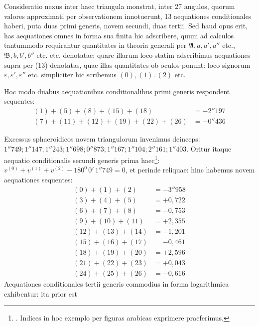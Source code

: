 Consideratio nexus inter haec triangula monstrat, inter 27 angulos, quorum valores approximati per observationem innotuerunt, 13 aequationes conditionales haberi, puta duas primi generis, novem secundi, duas tertii. Sed haud opus erit, has aequationes omnes in forma sua finita hic adscribere, quum ad calculos tantummodo requirantur quantitates in theoria generali per \(\mathfrak A,a,a',a''\) etc., \(\mathfrak B,b,b',b''\) etc. etc. denotatae: quare illarum loco statim adscribimus aequationes supra per (13) denotatas, quae illas quantitates ob oculos ponunt: loco signorum \(\varepsilon,\varepsilon',\varepsilon''\) etc. simpliciter hic scribemus \((0),(1).\ (2)\) etc.

Hoc modo duabus aequationibus conditionalibus primi generis respondent sequentes:
\[
\begin{aligned}
(1)+(5)+(8)+(15)+(18)&=-2''197\\
(7)+(11)+(12)+(19)+(22)+(26)&=-0''436
\end{aligned}
\]

Excessus sphaeroidicos novem triangulorum invenimus deinceps: \(1''749;\allowbreak1''147;\allowbreak1''243;\allowbreak1''698;\allowbreak0''873;\allowbreak1''167;\allowbreak1''104;\allowbreak2''161;\allowbreak1''403\). Oritur itaque aequatio conditionalis secundi generis prima haec\footnote{. Indices in hoc exemplo per figuras arabicas exprimere praeferimus.}: \(v^{(0)}+v^{(1)}+v^{(2)}-180^0\,0'\,1''749=0\), et perinde reliquae: hinc habemus novem aequationes sequentes:
\[
\begin{aligned}
(0)+(1)+(2)&=-3''958\\
(3)+(4)+(5)&=+0{,}722\\
(6)+(7)+(8)&=-0{,}753\\
(9)+(10)+(11)&=+2{,}355\\
(12)+(13)+(14)&=-1{,}201\\
(15)+(16)+(17)&=-0{,}461\\
(18)+(19)+(20)&=+2{,}596\\
(21)+(22)+(23)&=+0{,}043\\
(24)+(25)+(26)&=-0{,}616
\end{aligned}
\]
Aequationes conditionales tertii generis commodius in forma logarithmica exhibentur: ita prior est
